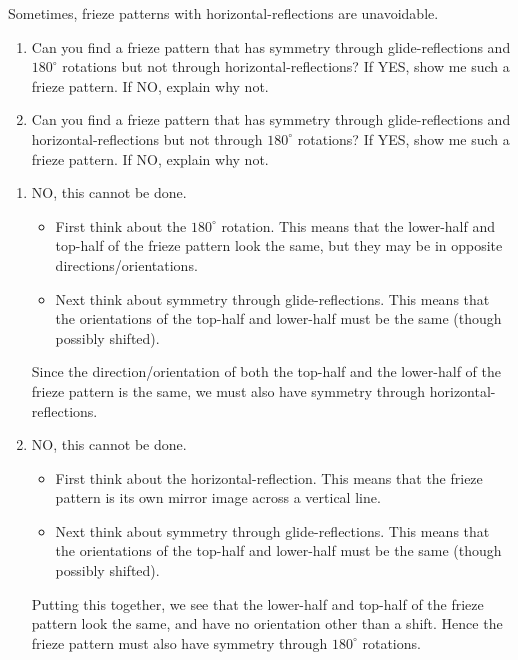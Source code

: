 \documentclass[noauthor,nooutcomes,hints,handout]{ximera}
\begin{document}
\begin{question}
  Sometimes, frieze patterns with horizontal-reflections are unavoidable.
  \begin{enumerate}
  \item Can you find a frieze pattern that has symmetry through
    glide-reflections and $180^\circ$ rotations but not through
    horizontal-reflections? If YES, show me such a frieze pattern. If
    NO, explain why not.
  \item Can you find a frieze pattern that has symmetry through
    glide-reflections and horizontal-reflections but not through
    $180^\circ$ rotations? If YES, show me such a frieze pattern. If
    NO, explain why not.
  \end{enumerate}
    
  \begin{freeResponse}
    \begin{enumerate}
    \item NO, this cannot be done.
      \begin{itemize}
      \item First think about the $180^\circ$ rotation. This means
        that the lower-half and top-half of the frieze pattern look
        the same, but they may be in opposite directions/orientations.
      \item Next think about symmetry through glide-reflections. This
        means that the orientations of the top-half and lower-half
        must be the same (though possibly shifted).
      \end{itemize}
      Since the direction/orientation of both the top-half and the
      lower-half of the frieze pattern is the same, we must also have
      symmetry through horizontal-reflections.
    \item NO, this cannot be done.
      \begin{itemize}
      \item First think about the horizontal-reflection. This means
        that the frieze pattern is its own mirror image across a
        vertical line. 
      \item Next think about symmetry through glide-reflections. This
        means that the orientations of the top-half and lower-half
        must be the same (though possibly shifted).
      \end{itemize}
      Putting this together, we see that the lower-half and top-half
      of the frieze pattern look the same, and have no orientation
      other than a shift. Hence the frieze pattern must also have
      symmetry through $180^\circ$ rotations.
    \end{enumerate}
  \end{freeResponse}
\end{question}
\mynewpage
\end{document}
